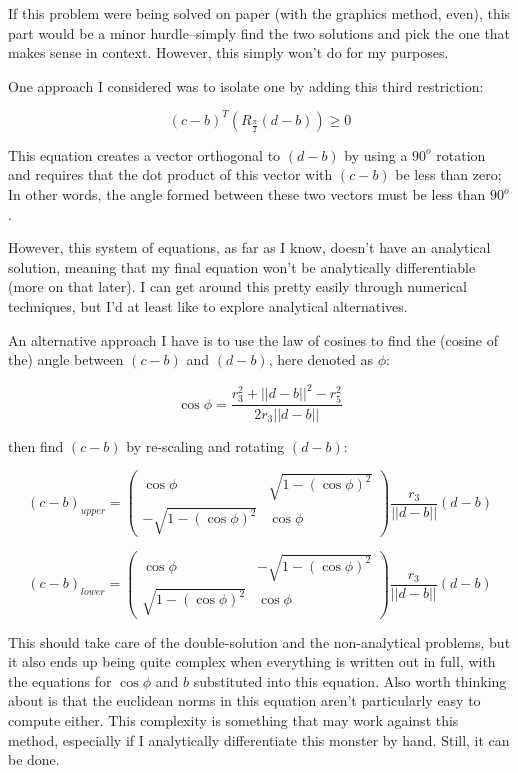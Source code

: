 \documentclass[12pt, letterpaper]{article}
\begin{document}
If this problem were being solved on paper (with the graphics method, even), this part would be a minor hurdle--simply find the two solutions and pick the one that makes sense in context. However, this simply won't do for my purposes.

One approach I considered was to isolate one by adding this third restriction:

\[(c-b)^T\left(R_{\frac{\pi}2}(d-b)\right) \ge 0\]

This equation creates a vector orthogonal to \((d-b)\) by using a \(90^o\) rotation and requires that the dot product of this vector with \((c-b)\) be less than zero; In other words, the angle formed between these two vectors must be less than \(90^o\).

However, this system of equations, as far as I know, doesn't have an analytical solution, meaning that my final equation won't be analytically differentiable (more on that later). I can get around this pretty easily through numerical techniques, but I'd at least like to explore analytical alternatives.

An alternative approach I have is to use the law of cosines to find the (cosine of the) angle between \((c-b)\) and \((d-b)\), here denoted as \(\phi\):

\[\cos\phi = \frac{r_3^2+||d-b||^2-r_5^2}{2r_3||d-b||}\]

then find \((c-b)\) by re-scaling and rotating \((d-b)\):

\[(c-b)_{upper}=\begin{pmatrix}\cos\phi & \sqrt{1-\left(\cos\phi\right)^2}\\
-\sqrt{1-\left(\cos\phi\right)^2} & \cos\phi\end{pmatrix}\frac{r_3}{||d-b||}(d-b)\]


\[(c-b)_{lower}=\begin{pmatrix}\cos\phi & -\sqrt{1-\left(\cos\phi\right)^2}\\
\sqrt{1-\left(\cos\phi\right)^2} & \cos\phi\end{pmatrix}\frac{r_3}{||d-b||}(d-b)\]

This should take care of the double-solution and the non-analytical problems, but it also ends up being quite complex when everything is written out in full, with the equations for \(\cos\phi\) and \(b\) substituted into this equation. Also worth thinking about is that the euclidean norms in this equation aren't particularly easy to compute either. This complexity is something that may work against this method, especially if I analytically differentiate this monster by hand. Still, it can be done.
\end{document}
